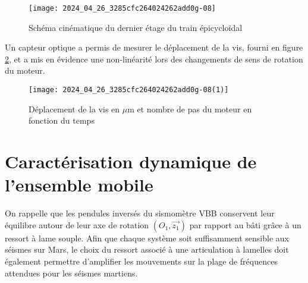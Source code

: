 

\begin{figure}[!h]
\centering
\texttt{[image: 2024\_04\_26\_3285cfc264024262add0g-08]}
\caption{\label{ccmp2023_fig_09} Schéma cinématique du dernier étage du train épicycloïdal}
\end{figure}




Un capteur optique a permis de mesurer le déplacement de la vis, fourni en figure \ref{ccmp2023_fig_10}, et a mis en évidence une non-linéarité lors des changements de sens de rotation du moteur.\\

\begin{figure}[!h]
\centering
\texttt{[image: 2024\_04\_26\_3285cfc264024262add0g-08(1)]}
\caption{\label{ccmp2023_fig_10} Déplacement de la vis en $\mu \mathrm{m}$ et nombre de pas du moteur en fonction du temps}
\end{figure}




\section{Caractérisation dynamique de l'ensemble mobile}
On rappelle que les pendules inversés du sismomètre VBB conservent leur équilibre autour de leur axe de rotation $\left(O_{1}, \overrightarrow{z_{1}}\right)$ par rapport au bâti grâce à un ressort à lame souple. Afin que chaque système soit suffisamment sensible aux séismes sur Mars, le choix du ressort associé à une articulation à lamelles doit également permettre d'amplifier les mouvements sur la plage de fréquences attendues pour les séismes martiens.

